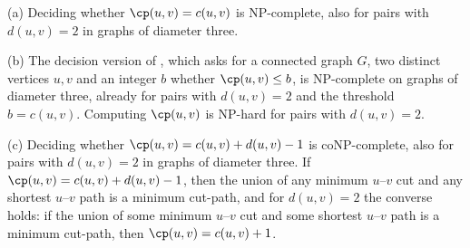 \begin{corollary}
\label{cor:dt-consequences}
(a) Deciding whether $\cp(u, v) = c(u, v)$ is NP-complete, also for pairs with $d(u, v) = 2$ in graphs of diameter three.

(b) The decision version of \MinCutPath{}, which asks for a connected graph $G$, two distinct vertices $u, v$ and an integer $b$ whether $\cp(u, v) \leq b$, is NP-complete on graphs of diameter three, already for pairs with $d(u, v) = 2$ and the threshold $b = c(u, v)$.
Computing $\cp(u, v)$ is NP-hard for pairs with $d(u, v) = 2$.

(c) Deciding whether $\cp(u, v) = c(u, v) + d(u, v) - 1$ is coNP-complete, also for pairs with $d(u, v) = 2$ in graphs of diameter three.
If $\cp(u, v) = c(u, v) + d(u, v) - 1$, then the union of any minimum $u$--$v$ cut and any shortest $u$--$v$ path is a minimum cut-path, and for $d(u, v) = 2$ the converse holds: if the union of some minimum $u$--$v$ cut and some shortest $u$--$v$ path is a minimum cut-path, then $\cp(u, v) = c(u, v) + 1$.
\end{corollary}

